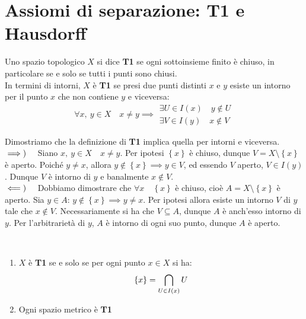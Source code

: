 \section{Assiomi di separazione: T1 e Hausdorff}
\begin{define}
	Uno spazio topologico $X$ si dice \textbf{T1} se ogni sottoinsieme finito è chiuso, in particolare se e solo se tutti i punti sono chiusi.\\
	In termini di intorni, $X$ è \textbf{T1} se presi due punti distinti $x$ e $y$ esiste un intorno per il punto $x$ che non contiene $y$ e viceversa:
	\begin{equation}
		\forall x,\ y\in X\quad x\neq y\implies
		\begin{array}{l}
			\exists U\in I\left(x\right)\quad y\notin U\\
			\exists V\in I\left(y\right)\quad x\notin V
		\end{array}
	\end{equation}
\end{define}
\begin{demonstration} Dimostriamo che la definizione di \textbf{T1} implica quella per intorni e viceversa.\\
	$\implies)\quad$ Siano $x,\ y\in X\quad x\neq y$. Per ipotesi $\left\{x\right\}$ è chiuso, dunque $V=X\setminus\left\{x\right\}$ è aperto. Poiché $y\neq x$, allora $y\notin\left\{x\right\}\implies y\in V$, ed essendo $V$ aperto, $V\in I\left(y\right)$. Dunque $V$ è intorno di $y$ e banalmente $x\notin V$.\\
	$\impliedby)\quad$ Dobbiamo dimostrare che $\forall x\quad \left\{x\right\}$ è chiuso, cioè $A=X\setminus\left\{x\right\}$ è aperto. Sia $y\in A$: $y\notin \left\{x\right\}\implies y\neq x$. Per ipotesi allora esiste un intorno $V$ di $y$ tale che $x\notin V$. Necessariamente si ha che $V\subseteq A$, dunque $A$ è anch'esso intorno di $y$. Per l'arbitrarietà di $y$, $A$ è intorno di ogni suo punto, dunque $A$ è aperto.
\end{demonstration}
\begin{observe}~{}
	\begin{enumerate}
		\item $X$ è \textbf{T1} se e solo se per ogni punto $x\in X$ si ha:
		\begin{equation}
			\left\{x\right\}=\mathop{{\bigcap}}\displaylimits_{U\in I\left(x\right)}U
		\end{equation}
		\item Ogni spazio metrico è \textbf{T1}
	\end{enumerate}
\end{observe}
